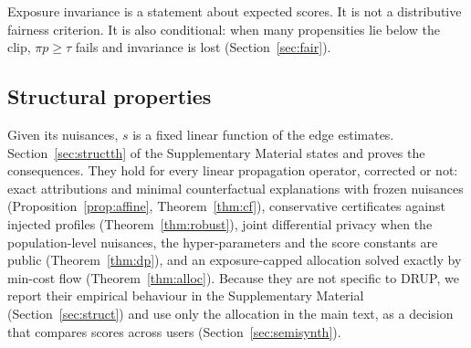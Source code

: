 Exposure invariance is a statement about expected scores. It is not a
distributive fairness criterion. It is also conditional: when many propensities
lie below the clip, $\pi p\ge\tau$ fails and invariance is lost
(Section~\ref{sec:fair}).

\subsection{Structural properties}\label{sec:structsum}

Given its nuisances, $s$ is a fixed linear function of the edge estimates.
Section~\ref{sec:structth} of the Supplementary Material states and proves the
consequences. They hold for every linear propagation operator, corrected or
not: exact attributions and minimal counterfactual explanations with frozen
nuisances (Proposition~\ref{prop:affine}, Theorem~\ref{thm:cf}), conservative
certificates against injected profiles (Theorem~\ref{thm:robust}), joint
differential privacy when the population-level nuisances, the
hyper-parameters and the score constants are public (Theorem~\ref{thm:dp}),
and an exposure-capped allocation solved exactly by min-cost flow
(Theorem~\ref{thm:alloc}). Because they are not specific to DRUP, we report
their empirical behaviour in the Supplementary Material
(Section~\ref{sec:struct}) and use only the allocation in the main text, as a
decision that compares scores across users (Section~\ref{sec:semisynth}).
